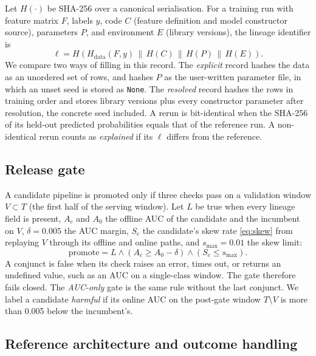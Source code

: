 \documentclass[journal]{IEEEtran}
\begin{document}
Let $H(\cdot)$ be SHA-256 over a canonical serialisation. For a training run with feature matrix $F$, labels $y$, code $C$ (feature definition and model constructor source), parameters $P$, and environment $E$ (library versions), the lineage identifier is
\begin{equation}
\ell=H\!\left(H_{\mathrm{data}}(F,y)\,\|\,H(C)\,\|\,H(P)\,\|\,H(E)\right).
\label{eq:lineage}
\end{equation}
We compare two ways of filling in this record. The \emph{explicit} record hashes the data as an unordered set of rows, and hashes $P$ as the user-written parameter file, in which an unset seed is stored as \texttt{None}. The \emph{resolved} record hashes the rows in training order and stores library versions plus every constructor parameter after resolution, the concrete seed included. A rerun is bit-identical when the SHA-256 of its held-out predicted probabilities equals that of the reference run. A non-identical rerun counts as \emph{explained} if its $\ell$ differs from the reference.

\subsection{Release gate}
\label{sec:gate}

A candidate pipeline is promoted only if three checks pass on a validation window $V\subset T$ (the first half of the serving window). Let $L$ be true when every lineage field is present, $A_c$ and $A_0$ the offline AUC of the candidate and the incumbent on $V$, $\delta=0.005$ the AUC margin, $S_c$ the candidate's skew rate \eqref{eq:skew} from replaying $V$ through its offline and online paths, and $s_{\max}=0.01$ the skew limit:
\begin{equation}
\mathrm{promote}=L\wedge\left(A_c\ge A_0-\delta\right)\wedge\left(S_c\le s_{\max}\right).
\label{eq:gate}
\end{equation}
A conjunct is false when its check raises an error, times out, or returns an undefined value, such as an AUC on a single-class window. The gate therefore fails closed. The \emph{AUC-only} gate is the same rule without the last conjunct. We label a candidate \emph{harmful} if its online AUC on the post-gate window $T\setminus V$ is more than 0.005 below the incumbent's.

\subsection{Reference architecture and outcome handling}
\label{sec:arch}
\end{document}
